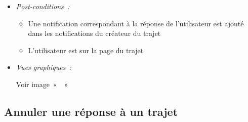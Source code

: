 \begin{itemize}
\item \textit{Post-conditions~:}
    \begin{itemize}
            \item Une notification correspondant à la réponse de l'utilisateur est ajouté dans les notifications du créateur du trajet
        \item L'utilisateur est sur la page du trajet
        \end{itemize}
        
        \item \textit{Vues graphiques~:}
        
        Voir image~«~~»

\end{itemize}


\subsection{Annuler une réponse à un trajet}\label{subsec:annuler-reponse-trajet}

